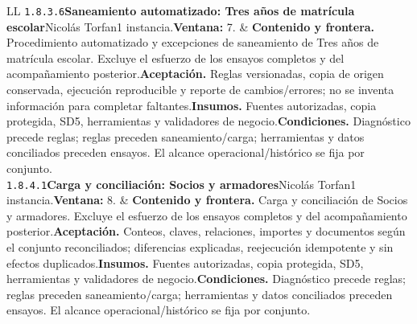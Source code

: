 \begin{longtable}{L{\tabcolsep\relax}L{\tabcolsep\relax}}
\texttt{1.\allowbreak{}8.\allowbreak{}3.\allowbreak{}6}\newline{}\textbf{Saneamiento automatizado: Tres años de matrícula escolar}\newline{}Nicolás Torfan\newline{}1 instancia.\newline{}\textbf{Ventana:} 7. & \textbf{Contenido y frontera.} Procedimiento automatizado y excepciones de saneamiento de Tres años de matrícula escolar. Excluye el esfuerzo de los ensayos completos y del acompañamiento posterior.\newline{}\textbf{Aceptación.} Reglas versionadas, copia de origen conservada, ejecución reproducible y reporte de cambios/errores; no se inventa información para completar faltantes.\newline{}\textbf{Insumos.} Fuentes autorizadas, copia protegida, SD5, herramientas y validadores de negocio.\newline{}\textbf{Condiciones.} Diagnóstico precede reglas; reglas preceden saneamiento/carga; herramientas y datos conciliados preceden ensayos. El alcance operacional/histórico se fija por conjunto.\\\hline
\texttt{1.\allowbreak{}8.\allowbreak{}4.\allowbreak{}1}\newline{}\textbf{Carga y conciliación: Socios y armadores}\newline{}Nicolás Torfan\newline{}1 instancia.\newline{}\textbf{Ventana:} 8. & \textbf{Contenido y frontera.} Carga y conciliación de Socios y armadores. Excluye el esfuerzo de los ensayos completos y del acompañamiento posterior.\newline{}\textbf{Aceptación.} Conteos, claves, relaciones, importes y documentos según el conjunto reconciliados; diferencias explicadas, reejecución idempotente y sin efectos duplicados.\newline{}\textbf{Insumos.} Fuentes autorizadas, copia protegida, SD5, herramientas y validadores de negocio.\newline{}\textbf{Condiciones.} Diagnóstico precede reglas; reglas preceden saneamiento/carga; herramientas y datos conciliados preceden ensayos. El alcance operacional/histórico se fija por conjunto.\\\hline

\end{longtable}
